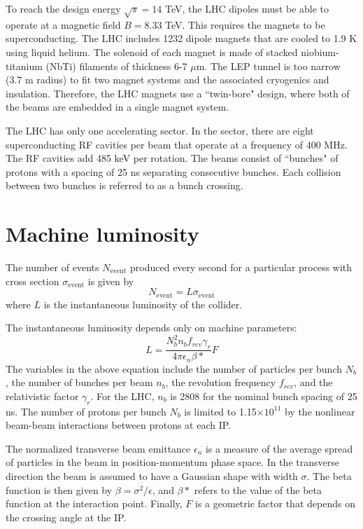 To reach the design energy $\sqrt{s} = 14$ TeV, the LHC dipoles must be able to operate at a magnetic field $B = 8.33$ TeV. This requires the magnets to be superconducting. The LHC includes 1232 dipole magnets that are cooled to 1.9 K using liquid helium. The solenoid of each magnet is made of stacked niobium-titanium (NbTi) filaments of thickness 6-7 $\mu$m. The LEP tunnel is too narrow (3.7 m radius) to fit two magnet systems and the associated cryogenics and insulation. Therefore, the LHC magnets use a ``twin-bore" design, where both of the beams are embedded in a single magnet system.

The LHC has only one accelerating sector. In the sector, there are eight superconducting RF cavities per beam that operate at a frequency of 400 MHz. The RF cavities add 485 keV per rotation. The beams consist of ``bunches" of protons with a spacing of 25 ns separating consecutive bunches. Each collision between two bunches is referred to as a bunch crossing. 

\section{Machine luminosity}
\label{sec:tunnel}

The number of events $N_{\mathrm{event}}$ produced every second for a particular process with cross section $\sigma_{\mathrm{event}}$ is given by
\begin{equation}
N_{\mathrm{event}} = L\sigma_{\mathrm{event}}
\end{equation}
where $L$ is the instantaneous luminosity of the collider. 

The instantaneous luminosity depends only on machine parameters: 
\begin{equation}
L = \frac{N_b^2 n_b f_{rev} \gamma_r}{4\pi\epsilon_n\beta\ast}F
\end{equation}
The variables in the above equation include the number of particles per bunch $N_b$, the number of bunches per beam $n_b$, the revolution frequency $f_{rev}$, and the relativistic factor $\gamma_r$. For the LHC, $n_b$ is 2808 for the nominal bunch spacing of 25 ns. The number of protons per bunch $N_b$ is limited to 1.15$\times 10^{11}$ by the nonlinear beam-beam interactions between protons at each IP. 

The normalized transverse beam emittance $\epsilon_n$ is a measure of the average spread of particles in the beam in position-momentum phase space. In the transverse direction the beam is assumed to have a Gaussian shape with width $\sigma$. The beta function is then given by $\beta = \sigma^2 /\epsilon$, and $\beta\ast$ refers to the value of the beta function at the interaction point. Finally, $F$ is a geometric factor that depends on the crossing angle at the IP. 

